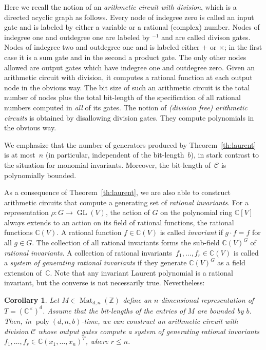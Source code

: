 \documentclass[10pt,a4paper]{article}
\DeclareMathOperator{\GL}{GL}
\DeclareMathOperator{\poly}{poly}
\DeclareMathOperator{\Mat}{Mat}
\newtheorem{corollary}[theorem]{Corollary}
\theoremstyle{definition}
\numberwithin{equation}{section}
\newcommand{\CC}{\mathbb{C}}
\newcommand{\ZZ}{\mathbb{Z}}
\begin{document}
Here we recall the notion of an \emph{arithmetic circuit with division}, which is a directed acyclic graph as follows.
Every node of indegree zero is called an input gate and is labeled by either a variable or a rational (complex) number.
Nodes of indegree one and outdegree one are labeled by $^{-1}$ and are called divison gates.
Nodes of indegree two and outdegree one and is labeled either $+$ or $\times$; in the first case it is a sum gate and in the second a product gate.
The only other nodes allowed are output gates which have indegree one and outdegree zero. Given an arithmetic circuit with division,
it computes a rational function at each output node in the obvious way. The bit size of such an arithmetic circuit is
the total number of nodes plus the total bit-length of the specification of all rational numbers computed in {\em all} of its gates.
The notion of {\em (division free) arithmetic circuits} is obtained by disallowing division gates.
They compute polynomials in the obvious way.

We emphasize that the number of generators produced by Theorem~\ref{th:laurent} is at most~$n$ (in particular, independent of the bit-length~$b$), in stark contrast to the situation for monomial invariants.
Moreover, the bit-length of~$\mathcal{C}$ is polynomially bounded.

As a consequence of Theorem~\ref{th:laurent}, we are also able to construct arithmetic circuits that compute a generating set of \emph{rational invariants}.
For a representation $\rho\colon G \rightarrow \GL(V)$, the action of $G$ on the polynomial ring $\CC[V]$ always extends to an action on its field of rational functions, the rational functions $\CC(V)$.
A rational function $f \in \CC(V)$ is called \emph{invariant} if $g \cdot f = f$ for all $g \in G$.
The collection of all rational invariants forms the sub-field $\CC(V)^G$ of \emph{rational invariants}.
A collection of rational invariants~$f_1,\dots,f_r \in \CC(V)$ is called a \emph{system of generating rational invariants} if they generate $\CC(V)^G$ as a field extension of~$\CC$.
Note that any invariant Laurent polynomial is a rational invariant, but the converse is not necessarily true.
Nevertheless:

\begin{corollary}\label{cor:1.3}
Let $M \in\Mat_{d,n}(\ZZ)$ define an $n$-dimensional representation of $T = (\CC^\times)^d$. Assume that the bit-lengths of the entries of $M$ are bounded by $b$.  Then, in $\poly(d,n,b)$-time, we can construct an arithmetic circuit with division $\mathcal{C}$ whose output gates compute a system of generating rational invariants $f_1,\dots,f_r \in \CC(x_1,\dots,x_n)^T$, where $r \leq n$.
\end{corollary}
\end{document}
